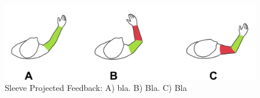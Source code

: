 \begin{figure}[!b]
    \begin{center}
        \includegraphics[width=\columnwidth]{imgs/visualfeedback.png}
    \end{center}
    \caption{Sleeve Projected Feedback: A) bla. B) Bla. C) Bla}
    \label{fig:vision}
\end{figure}
